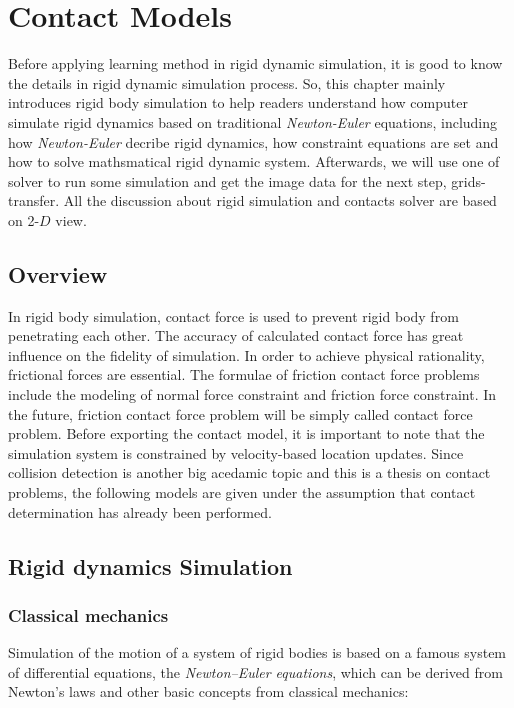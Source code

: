 \chapter{Contact Models}

Before applying learning method in rigid dynamic simulation, it is good to know the details in rigid dynamic simulation process. So, this chapter mainly introduces rigid body simulation to help readers understand how computer simulate rigid dynamics based on traditional \textit{Newton-Euler} equations, including how \textit{Newton-Euler} decribe rigid dynamics, how constraint equations are set and how to solve mathsmatical rigid dynamic system. Afterwards, we will use one of solver to run some simulation and get the image data for the next step, grids-transfer. All the discussion about rigid simulation and contacts solver are based on 2-$D$ view.

\section{Overview}
In rigid body simulation, contact force is used to prevent rigid body from penetrating each other. The accuracy of calculated contact force has great influence on the fidelity of simulation. In order to achieve physical rationality, frictional forces are essential. The formulae of friction contact force problems include the modeling of normal force constraint and friction force constraint. In the future, friction contact force problem will be simply called contact force problem. Before exporting the contact model, it is important to note that the simulation system is constrained by velocity-based location updates\cite{Erleben:2007:VSP:1243980.1243986}. Since collision detection is another big acedamic topic\cite{boulic2007collision} and this is a thesis on contact problems, the following models are given under the assumption that contact determination has already been performed.

\section{Rigid dynamics Simulation}

\subsection{Classical mechanics}
Simulation of the motion of a system of rigid bodies is based on a famous system of differential equations, the \textit{Newton–Euler equations}, which can be derived from Newton’s laws and other basic concepts from classical mechanics:

